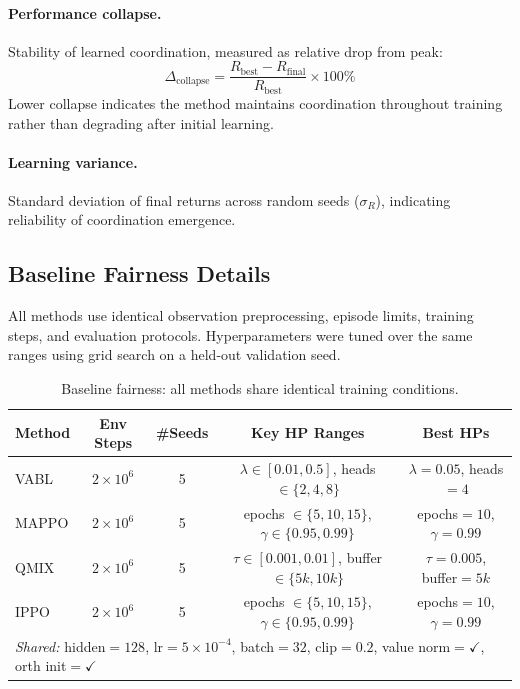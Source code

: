 \documentclass{article}
\theoremstyle{plain}
\theoremstyle{definition}
\theoremstyle{remark}
\begin{document}
\paragraph{Performance collapse.} Stability of learned coordination, measured as relative drop from peak:
\begin{equation}
\Delta_{\mathrm{collapse}} = \frac{R_{\mathrm{best}} - R_{\mathrm{final}}}{R_{\mathrm{best}}} \times 100\%
\end{equation}
Lower collapse indicates the method maintains coordination throughout training rather than degrading after initial learning.

\paragraph{Learning variance.} Standard deviation of final returns across random seeds ($\sigma_R$), indicating reliability of coordination emergence.

\subsection{Baseline Fairness Details}
\label{app:baseline_fairness}

All methods use identical observation preprocessing, episode limits, training steps, and evaluation protocols. Hyperparameters were tuned over the same ranges using grid search on a held-out validation seed.

\begin{table}[h]
\centering
\caption{Baseline fairness: all methods share identical training conditions.}
\begin{tabular}{lcccc}
\toprule
\textbf{Method} & \textbf{Env Steps} & \textbf{\#Seeds} & \textbf{Key HP Ranges} & \textbf{Best HPs} \\
\midrule
VABL & $2 \times 10^6$ & 5 & $\lambda \in [0.01, 0.5]$, heads $\in \{2,4,8\}$ & $\lambda=0.05$, heads$=4$ \\
MAPPO & $2 \times 10^6$ & 5 & epochs $\in \{5,10,15\}$, $\gamma \in \{0.95,0.99\}$ & epochs$=10$, $\gamma=0.99$ \\
QMIX & $2 \times 10^6$ & 5 & $\tau \in [0.001, 0.01]$, buffer $\in \{5k,10k\}$ & $\tau=0.005$, buffer$=5k$ \\
IPPO & $2 \times 10^6$ & 5 & epochs $\in \{5,10,15\}$, $\gamma \in \{0.95,0.99\}$ & epochs$=10$, $\gamma=0.99$ \\
\midrule
\multicolumn{5}{l}{\footnotesize \textit{Shared:} hidden$=128$, lr$=5\times10^{-4}$, batch$=32$, clip$=0.2$, value norm$=\checkmark$, orth init$=\checkmark$} \\
\bottomrule
\end{tabular}
\end{table}
\end{document}

